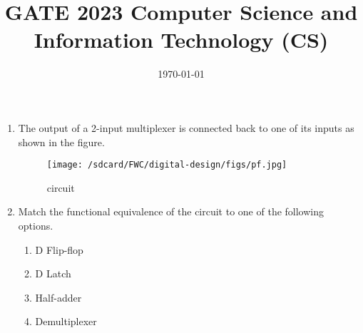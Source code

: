 \documentclass[10pt]{article}
\begin{document}
\title{\textbf{GATE 2023 Computer Science and 
Information Technology (CS)}}
\date{\today}
\maketitle
\begin{enumerate}
    \item
    The output of a 2-input multiplexer is connected
back to one of its inputs as shown in the figure.

\begin{figure}[H]
\centering
\texttt{[image: /sdcard/FWC/digital-design/figs/pf.jpg]}
\caption{circuit}
\label{fig:lcd}
\end{figure}
\item
 Match the functional equivalence of the circuit to
 one of the following options.

\begin{enumerate}
    \item D Flip-flop
    \item D Latch
    \item Half-adder
    \item Demultiplexer
\end{enumerate}
\end{enumerate}
\end{document}
